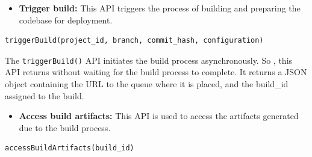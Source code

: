 \begin{itemize}
\item
\protect{}\label{5ASaQQLjLogHkfHrKcqsc}
\textbf{Trigger build:} This API triggers the process of building and preparing the codebase for deployment.\\
\end{itemize}

\begin{lstlisting}[language=c++17]
triggerBuild(project_id, branch, commit_hash, configuration)
\end{lstlisting}

The \texttt{triggerBuild()} API initiates the build process asynchronously. So , this API returns without waiting for the build process to complete. It returns a JSON object containing the URL to the queue where it is placed, and the build\_id assigned to the build.

\begin{table}[htbp]
\centering
\small
{}
\end{table}

\begin{itemize}
\item
\protect{}\label{ugOucfcP33fw4ptV-M1Bt}
\textbf{Access build artifacts:} This API is used to access the artifacts generated due to the build process.
\end{itemize}

\begin{lstlisting}[language=c++17]
accessBuildArtifacts(build_id)
\end{lstlisting}

\begin{table}[htbp]
\centering
\small
{}
\end{table}

